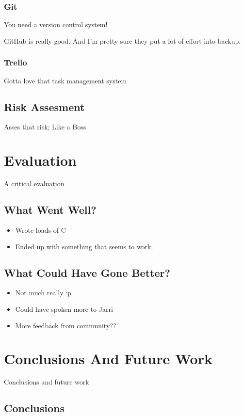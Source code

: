 \documentclass[12pt]{report}
\begin{document}
\subsection{Git}
You need a version control system!

GitHub is really good. And I'm pretty sure they put a lot of effort into backup.

\subsection{Trello}
Gotta love that task management system

\section{Risk Assesment}
Asses that risk; Like a Boss

\chapter{Evaluation}
A critical evaluation

\section{What Went Well?}

\begin{itemize}
\item Wrote loads of C
\item Ended up with something that seems to work.
\end{itemize}

\section{What Could Have Gone Better?}

\begin{itemize}
\item Not much really :p
\item Could have spoken more to Jarri
\item More feedback from community??
\end{itemize}

\chapter{Conclusions And Future Work}
Conclusions and future work

\section{Conclusions}
\end{document}
